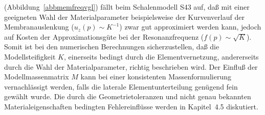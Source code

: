 (Abbildung~\ref{abbmemfreqvgl}) fällt beim Schalenmodell S43 auf, daß mit
einer geeigneten Wahl der Materialparameter beispielsweise der Kurvenverlauf
der Membranauslenkung ($u_{z}(p) \sim K^{-1}$) zwar gut approximiert
werden kann, jedoch auf Kosten der Approximationsgüte bei der
Resonanzfrequenz ($f(p) \sim \sqrt{K}$).
Somit ist bei den numerischen Berechnungen sicherzustellen, daß die
Modellsteifigkeit $K$, einerseits bedingt durch die Elementvernetzung,
andererseits durch die Wahl der Materialparameter, richtig beschrieben wird.
Der Einfluß der Modellmassenmatrix $M$ kann bei einer konsistenten
Massenformulierung vernachlässigt werden, falls die laterale
Elementunterteilung genügend fein gewählt wurde.
Die durch die Geometrietoleranzen und nicht genau bekannten
Materialeigenschaften bedingten Fehlereinflüsse werden in Kapitel~4.5
diskutiert.

